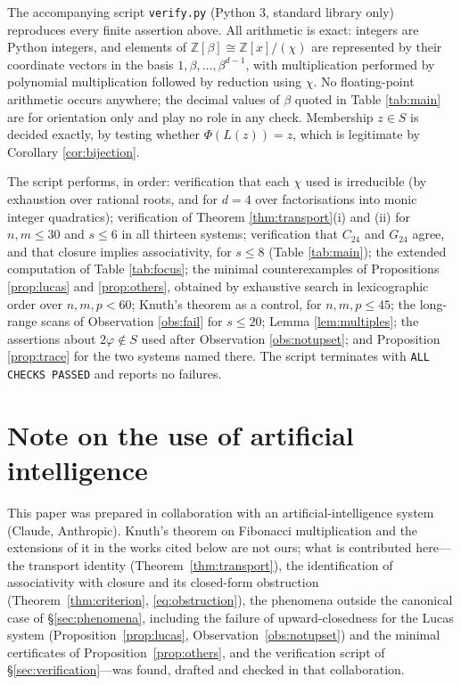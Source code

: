 \documentclass[11pt,reqno]{amsart}
\theoremstyle{plain}
\theoremstyle{definition}
\newcommand{\Z}{\mathbb{Z}}
\begin{document}
The accompanying script \texttt{verify.py} (Python 3, standard library only) reproduces every finite
assertion above. All arithmetic is exact: integers are Python integers, and elements of
$\Z[\beta]\cong\Z[x]/(\chi)$ are represented by their coordinate vectors in the basis
$1,\beta,\dots,\beta^{d-1}$, with multiplication performed by polynomial multiplication followed by
reduction using $\chi$. No floating-point arithmetic occurs anywhere; the decimal values of $\beta$
quoted in Table \ref{tab:main} are for orientation only and play no role in any check. Membership
$z\in S$ is decided exactly, by testing whether $\Phi(L(z))=z$, which is legitimate by
Corollary \ref{cor:bijection}.

The script performs, in order: verification that each $\chi$ used is irreducible (by exhaustion over
rational roots, and for $d=4$ over factorisations into monic integer quadratics); verification of
Theorem \ref{thm:transport}(i) and (ii) for $n,m\le30$ and $s\le6$ in all thirteen systems;
verification that $C_{24}$ and $G_{24}$ agree, and that closure implies associativity, for $s\le8$
(Table \ref{tab:main}); the extended computation of Table \ref{tab:focus}; the minimal
counterexamples of Propositions \ref{prop:lucas} and \ref{prop:others}, obtained by exhaustive
search in lexicographic order over $n,m,p<60$; Knuth's theorem as a control, for $n,m,p\le45$; the
long-range scans of Observation \ref{obs:fail} for $s\le20$; Lemma \ref{lem:multiples}; the
assertions about $2\varphi\notin S$ used after Observation \ref{obs:notupset}; and
Proposition \ref{prop:trace} for the two systems named there. The script terminates with
\texttt{ALL CHECKS PASSED} and reports no failures.

\section*{Note on the use of artificial intelligence}

This paper was prepared in collaboration with an artificial-intelligence system (Claude, Anthropic).
Knuth's theorem on Fibonacci multiplication and the extensions of it in the works cited below are
not ours; what is contributed here---the transport identity (Theorem~\ref{thm:transport}), the
identification of associativity with closure and its closed-form obstruction
(Theorem~\ref{thm:criterion}, \eqref{eq:obstruction}), the phenomena outside the canonical case of
\S\ref{sec:phenomena}, including the failure of upward-closedness for the Lucas system
(Proposition~\ref{prop:lucas}, Observation~\ref{obs:notupset}) and the minimal certificates of
Proposition~\ref{prop:others}, and the verification script of \S\ref{sec:verification}---was found,
drafted and checked in that collaboration.
\end{document}
